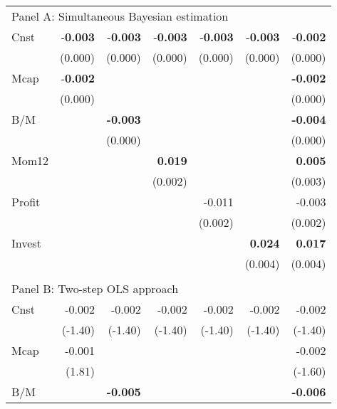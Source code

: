 \begin{singlespacing}
\begin{table}[H]
{\begin{tabular}{lrrrrrr}
\hline
\multicolumn{7}{l}{Panel A: Simultaneous Bayesian estimation}                                   \\ Cnst & -\textbf{0.003}  & -\textbf{0.003} & -\textbf{0.003}& -\textbf{0.003}&-\textbf{0.003} & -\textbf{0.002}\\ & (0.000) & (0.000) & (0.000) & (0.000) & (0.000) & (0.000) \\ 
Mcap   & -\textbf{0.002}  &                 &                &        &                & \textbf{-0.002}         \\
      & (0.000)  &                 &                &        &                & (0.000)          \\
B/M    &         & \textbf{-0.003} &                &        &                & \textbf{-0.004} \\
      &         & (0.000)          &                &        &                & (0.000)          \\
Mom12  &         &                 & \textbf{0.019} &        &                & \textbf{0.005}  \\
      &         &                 & (0.002)         &        &                & (0.003)          \\
Profit &         &                 &                & -0.011  &                & -0.003         \\
      &         &                 &                & (0.002) &                & (0.002)          \\
Invest &         &                 &                &        & \textbf{0.024} & \textbf{0.017}  \\
      &         &                 &                &        & (0.004)         & (0.004)          \\
      &         &                 &                &        &                &                 \\
\multicolumn{7}{l}{Panel B: Two-step OLS approach}                                   \\  Cnst & -0.002 & -0.002 &-0.002 & -0.002 & -0.002  & -0.002 \\ & (-1.40) & (-1.40) & (-1.40) & (-1.40) & (-1.40) & (-1.40) \\ 
Mcap   & -0.001 &         &        &         &        & -0.002  \\
      & (1.81) &         &        &         &        & (-1.60)  \\
B/M    &        & \textbf{-0.005}  &        &         &        & \textbf{-0.006}  \\

\end{tabular}}
\end{table}
\end{singlespacing}

